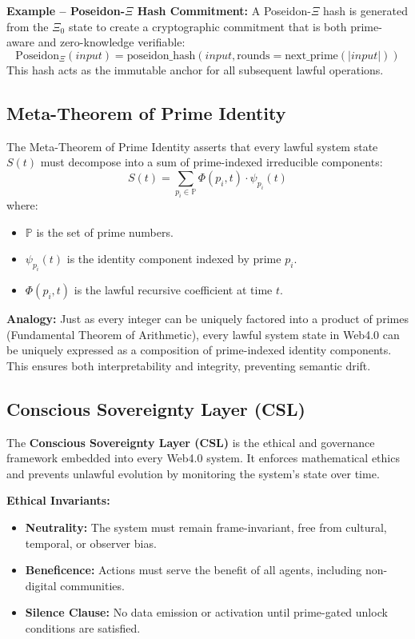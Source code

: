 \documentclass[12]{amsart}
\theoremstyle{plain}
\begin{document}
\textbf{Example -- Poseidon-$\Xi$ Hash Commitment:}
A Poseidon-$\Xi$ hash is generated from the $\Xi_0$ state to create a cryptographic commitment that is both prime-aware and zero-knowledge verifiable:
\begin{equation}
\text{Poseidon}_{\Xi}(input) = \text{poseidon\_hash}(input, \text{rounds} = \text{next\_prime}(|input|))
\end{equation}
This hash acts as the immutable anchor for all subsequent lawful operations.

\subsection{Meta-Theorem of Prime Identity}
The Meta-Theorem of Prime Identity asserts that every lawful system state $S(t)$ must decompose into a sum of prime-indexed irreducible components:
\begin{equation}
S(t) = \sum_{p_i \in \mathbb{P}} \Phi(p_i, t) \cdot \psi_{p_i}(t)
\end{equation}
where:
\begin{itemize}
    \item $\mathbb{P}$ is the set of prime numbers.
    \item $\psi_{p_i}(t)$ is the identity component indexed by prime $p_i$.
    \item $\Phi(p_i, t)$ is the lawful recursive coefficient at time $t$.
\end{itemize}

\textbf{Analogy:} Just as every integer can be uniquely factored into a product of primes (Fundamental Theorem of Arithmetic), every lawful system state in Web4.0 can be uniquely expressed as a composition of prime-indexed identity components. This ensures both interpretability and integrity, preventing semantic drift.

\subsection{Conscious Sovereignty Layer (CSL)}
The \textbf{Conscious Sovereignty Layer (CSL)} is the ethical and governance framework embedded into every Web4.0 system. It enforces mathematical ethics and prevents unlawful evolution by monitoring the system’s state over time.

\textbf{Ethical Invariants:}
\begin{itemize}
    \item \textbf{Neutrality:} The system must remain frame-invariant, free from cultural, temporal, or observer bias.
    \item \textbf{Beneficence:} Actions must serve the benefit of all agents, including non-digital communities.
    \item \textbf{Silence Clause:} No data emission or activation until prime-gated unlock conditions are satisfied.
\end{itemize}
\end{document}
